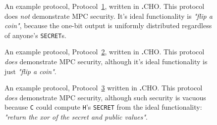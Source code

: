 \documentclass[acmlarge, manuscript, screen, review, anonymous, table]{acmart}
\newcommand{\inlinecode}[2][cho]{\lstinline[language=#1]{#2}}
\newcommand{\langname}{\textsc{\textbf{.}CHO}\xspace}
\begin{document}
\begin{figure}[tbhp]
  \begin{mdframed}
      
  \end{mdframed}
    \caption{An example protocol, Protocol~\ref{fig:example-insecure}, written in \langname.
    This protocol does \emph{not} demonstrate MPC security.
    It's ideal functionality is \textit{"flip a coin"},
    because the one-bit output is uniformly distributed regardless of anyone's \inlinecode{SECRET}s.}
  \label{fig:example-insecure}
\end{figure}
\begin{figure}[tbhp]
  \begin{mdframed}
      
  \end{mdframed}
  \caption{An example protocol, Protocol~\ref{fig:example-vac-protocol}, written in \langname.
    This protocol \emph{does} demonstrate MPC security, although it's ideal functionality is just \textit{"flip a coin"}.}
  \label{fig:example-vac-protocol}
\end{figure}
\begin{figure}[tbhp]
  \begin{mdframed}
      
  \end{mdframed}
  \caption{An example protocol, Protocol~\ref{fig:example-vac-secure} written in \langname.
    This protocol \emph{does} demonstrate MPC security,
    although such security is vacuous because \inlinecode{C} could compute \inlinecode{H}'s \inlinecode{SECRET}
    from the ideal functionality: \textit{"return the xor of the secret and public values"}.}
  \label{fig:example-vac-secure}
\end{figure}
\end{document}
